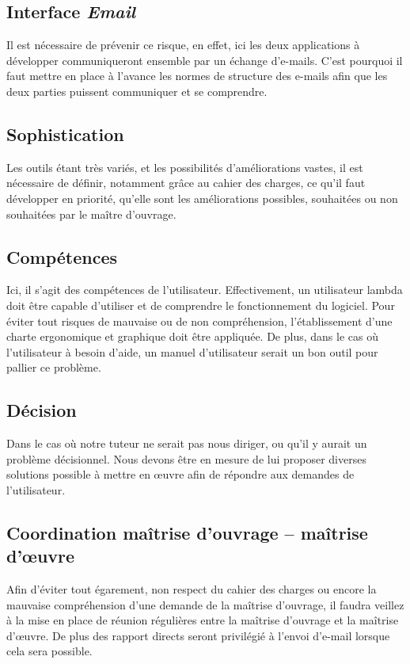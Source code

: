 \documentclass[etudiants]{support-iutrs}
\begin{document}
\subsection{Interface \emph{Email}}

Il est nécessaire de prévenir ce risque, en effet, ici les deux applications à développer communiqueront ensemble par un échange d'e-mails. C'est pourquoi il faut mettre en place à l'avance les normes de structure des e-mails afin que les deux parties  puissent communiquer et se comprendre.

\subsection{Sophistication}

Les outils étant très variés, et les possibilités d'améliorations vastes, il est nécessaire de définir, notamment grâce au cahier des charges, ce qu'il faut développer en priorité, qu'elle sont les améliorations possibles, souhaitées ou non souhaitées par le maître d'ouvrage.

\subsection{Compétences}

Ici, il s'agit des compétences de l'utilisateur. Effectivement, un utilisateur lambda doit être capable d'utiliser et de comprendre le fonctionnement du logiciel. Pour éviter tout risques de mauvaise ou de non compréhension, l'établissement d'une charte ergonomique et graphique doit être appliquée. De plus, dans le cas où l'utilisateur à besoin d'aide, un manuel d'utilisateur serait un bon outil pour pallier ce problème.

\subsection{Décision}

Dans le cas où notre tuteur ne serait pas nous diriger, ou qu'il y aurait un problème décisionnel. Nous devons être en mesure de lui proposer diverses solutions possible à mettre en œuvre afin de répondre aux demandes de l'utilisateur.  

\subsection{Coordination maîtrise d'ouvrage – maîtrise d’œuvre}

Afin d'éviter tout égarement, non respect du cahier des charges ou encore la mauvaise compréhension d'une demande de la maîtrise d'ouvrage, il faudra veillez à la mise en place de réunion régulières entre la maîtrise d'ouvrage et la maîtrise d’œuvre. 
De plus des rapport directs seront privilégié à l'envoi d'e-mail lorsque cela sera possible.    
\end{document}
